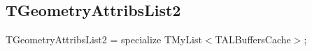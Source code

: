 \documentclass{report}
\begin{document}
\subsection*{TGeometryAttribsList2}
\begin{list}{}{
\setlength{\itemindent}{0cm}
\setlength{\listparindent}{0cm}
\setlength{\leftmargin}{\evensidemargin}
\addtolength{\leftmargin}{\tmplength}
\settowidth{\labelsep}{X}
\addtolength{\leftmargin}{\labelsep}
\setlength{\labelwidth}{\tmplength}
}
\begin{flushleft}
\item[\textbf{Declaration}\hfill]
\begin{ttfamily}
TGeometryAttribsList2 = specialize TMyList{$<$}TALBuffersCache{$>$};\end{ttfamily}


\end{flushleft}
\end{list}
\end{document}
